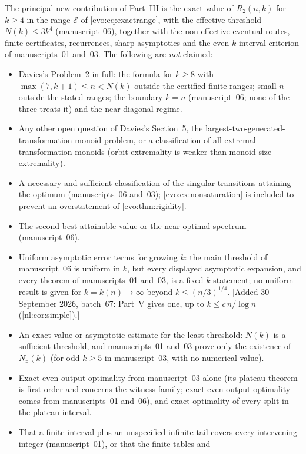 \documentclass[11pt,a4paper]{article}
\numberwithin{equation}{section}
\theoremstyle{definition}
\theoremstyle{remark}
\begin{document}
The principal new contribution of Part~III is the exact value of $R_2(n,k)$
for $k\ge4$ in the range $\mathcal E$ of \eqref{evo:eq:exactrange}, with the
effective threshold $N(k)\le3k^4$ (manuscript~06), together with the
non-effective eventual routes, finite certificates, recurrences, sharp
asymptotics and the even-$k$ interval criterion of manuscripts~01 and~03. The
following are \emph{not} claimed:
\begin{itemize}
\item Davies's Problem~2 in full: the formula for $k\ge8$ with
 $\max(7,k+1)\le n<N(k)$ outside the certified finite ranges; small $n$
 outside the stated ranges; the boundary $k=n$ (manuscript~06; none of the
 three treats it) and the near-diagonal regime.
\item Any other open question of Davies's Section~5, the
 largest-two-generated-transformation-monoid problem, or a classification
 of all extremal transformation monoids (orbit extremality is weaker than
 monoid-size extremality).
\item A necessary-and-sufficient classification of the singular transitions
 attaining the optimum (manuscripts~06 and~03); \cref{evo:ex:nonsaturation}
 is included to prevent an overstatement of \cref{evo:thm:rigidity}.
\item The second-best attainable value or the near-optimal spectrum
 (manuscript~06).
\item Uniform asymptotic error terms for growing $k$: the main threshold of
 manuscript~06 is uniform in $k$, but every displayed asymptotic expansion,
 and every theorem of manuscripts~01 and~03, is a fixed-$k$ statement; no
 uniform result is given for $k=k(n)\to\infty$ beyond
 $k\le(n/3)^{1/4}$. [Added 30 September 2026, batch~67: Part~V gives one, up to $k\le c\,n/\log n$
 (\cref{nl:cor:simple}).]
\item An exact value or asymptotic estimate for the least threshold: $N(k)$
 is a sufficient threshold, and manuscripts~01 and~03 prove only the
 existence of $N_\exists(k)$ (for odd $k\ge5$ in manuscript~03, with no
 numerical value).
\item Exact even-output optimality from manuscript~03 alone (its plateau
 theorem is first-order and concerns the witness family; exact even-output
 optimality comes from manuscripts~01 and~06), and exact optimality of every
 split in the plateau interval.
\item That a finite interval plus an unspecified infinite tail covers every
 intervening integer (manuscript~01), or that the finite tables and

\end{itemize}
\end{document}
